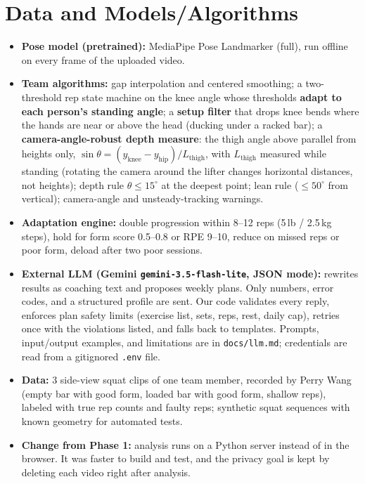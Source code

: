 \documentclass[11pt]{article}
\begin{document}
\section{Data and Models/Algorithms}
\begin{itemize}
  \item \textbf{Pose model (pretrained):} MediaPipe Pose Landmarker (full), run offline on every frame of the uploaded video.
  \item \textbf{Team algorithms:} gap interpolation and centered smoothing; a two-threshold rep state machine on the knee angle whose thresholds \textbf{adapt to each person's standing angle}; a \textbf{setup filter} that drops knee bends where the hands are near or above the head (ducking under a racked bar); a \textbf{camera-angle-robust depth measure}: the thigh angle above parallel from heights only, $\sin\theta = (y_\text{knee} - y_\text{hip}) / L_\text{thigh}$, with $L_\text{thigh}$ measured while standing (rotating the camera around the lifter changes horizontal distances, not heights); depth rule $\theta \le 15^\circ$ at the deepest point; lean rule ($\le 50^\circ$ from vertical); camera-angle and unsteady-tracking warnings.
  \item \textbf{Adaptation engine:} double progression within 8--12 reps (5\,lb / 2.5\,kg steps), hold for form score 0.5--0.8 or RPE 9--10, reduce on missed reps or poor form, deload after two poor sessions.
  \item \textbf{External LLM (Gemini \texttt{gemini-3.5-flash-lite}, JSON mode):} rewrites results as coaching text and proposes weekly plans. Only numbers, error codes, and a structured profile are sent. Our code validates every reply, enforces plan safety limits (exercise list, sets, reps, rest, daily cap), retries once with the violations listed, and falls back to templates. Prompts, input/output examples, and limitations are in \texttt{docs/llm.md}; credentials are read from a gitignored \texttt{.env} file.
  \item \textbf{Data:} 3 side-view squat clips of one team member, recorded by Perry Wang (empty bar with good form, loaded bar with good form, shallow reps), labeled with true rep counts and faulty reps; synthetic squat sequences with known geometry for automated tests.
  \item \textbf{Change from Phase 1:} analysis runs on a Python server instead of in the browser. It was faster to build and test, and the privacy goal is kept by deleting each video right after analysis.
\end{itemize}
\end{document}
